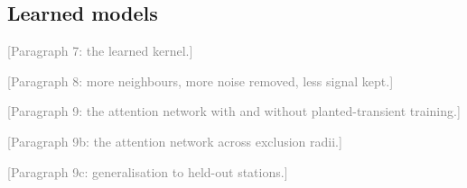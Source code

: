 \documentclass[preprint,12pt,authoryear]{elsarticle}
\newcommand{\towrite}[1]{\textcolor{gray}{[#1]}}
\begin{document}
\subsection{Learned models}

\towrite{Paragraph 7: the learned kernel.}

\towrite{Paragraph 8: more neighbours, more noise removed, less signal kept.}

\towrite{Paragraph 9: the attention network with and without planted-transient training.}

\towrite{Paragraph 9b: the attention network across exclusion radii.}

\towrite{Paragraph 9c: generalisation to held-out stations.}
\end{document}
